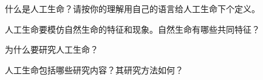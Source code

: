 \begin{question}
什么是人工生命？请按你的理解用自己的语言给人工生命下个定义。
\end{question}
\begin{solution}
\end{solution}

\begin{question}
人工生命要模仿自然生命的特征和现象。自然生命有哪些共同特征？
\end{question}
\begin{solution}
\end{solution}

\begin{question}
为什么要研究人工生命？
\end{question}
\begin{solution}
\end{solution}

\begin{question}
人工生命包括哪些研究内容？其研究方法如何？
\end{question}
\begin{solution}
\end{solution}
